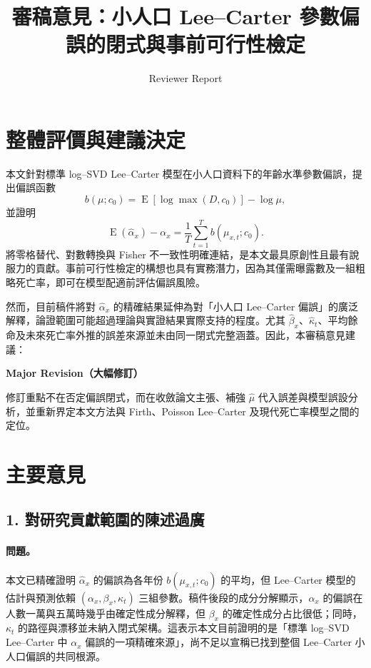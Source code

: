\documentclass[12pt,a4paper]{article}
\title{審稿意見：小人口 Lee--Carter 參數偏誤的閉式與事前可行性檢定}
\author{Reviewer Report}
\date{}
\begin{document}
\maketitle

\section*{整體評價與建議決定}

本文針對標準 log--SVD Lee--Carter 模型在小人口資料下的年齡水準參數偏誤，提出偏誤函數
\[
b(\mu;c_0)=\operatorname{E}\!\left[\log\max(D,c_0)\right]-\log\mu,
\]
並證明
\[
\operatorname{E}(\widehat{\alpha}_x)-\alpha_x
=\frac{1}{T}\sum_{t=1}^{T}b(\mu_{x,t};c_0).
\]
將零格替代、對數轉換與 Fisher 不一致性明確連結，是本文最具原創性且最有說服力的貢獻。事前可行性檢定的構想也具有實務潛力，因為其僅需曝露數及一組粗略死亡率，即可在模型配適前評估偏誤風險。

然而，目前稿件將對 $\widehat{\alpha}_x$ 的精確結果延伸為對「小人口 Lee--Carter 偏誤」的廣泛解釋，論證範圍可能超過理論與實證結果實際支持的程度。尤其 $\widehat{\beta}_x$、$\widehat{\kappa}_t$、平均餘命及未來死亡率外推的誤差來源並未由同一閉式完整涵蓋。因此，本審稿意見建議：

\begin{center}
\textbf{Major Revision（大幅修訂）}
\end{center}

修訂重點不在否定偏誤閉式，而在收斂論文主張、補強 $\widehat{\mu}$ 代入誤差與模型誤設分析，並重新界定本文方法與 Firth、Poisson Lee--Carter 及現代死亡率模型之間的定位。

\section*{主要意見}

\subsection*{1. 對研究貢獻範圍的陳述過廣}

\paragraph{問題。}
本文已精確證明 $\widehat{\alpha}_x$ 的偏誤為各年份 $b(\mu_{x,t};c_0)$ 的平均，但 Lee--Carter 模型的估計與預測依賴 $(\alpha_x,\beta_x,\kappa_t)$ 三組參數。稿件後段的成分分解顯示，$\alpha_x$ 的偏誤在人數一萬與五萬時幾乎由確定性成分解釋，但 $\beta_x$ 的確定性成分占比很低；同時，$\kappa_t$ 的路徑與漂移並未納入閉式架構。這表示本文目前證明的是「標準 log--SVD Lee--Carter 中 $\alpha_x$ 偏誤的一項精確來源」，尚不足以宣稱已找到整個 Lee--Carter 小人口偏誤的共同根源。
\end{document}
